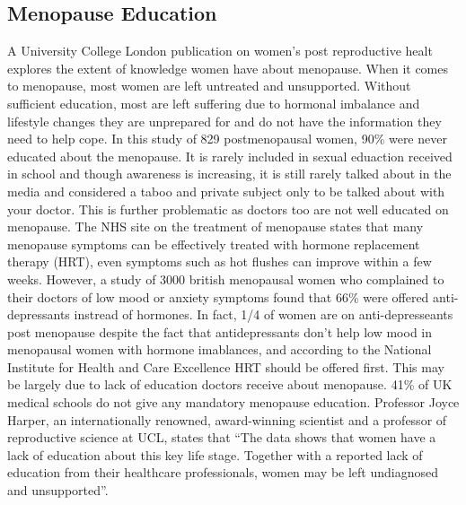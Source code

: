 \subsection{Menopause Education}
A University College London publication on women's post reproductive healt\cite{Aljumah2023} explores the extent of knowledge women have about menopause. When it comes to menopause, most women are left untreated and unsupported. Without sufficient education, most are left suffering due to hormonal imbalance and lifestyle changes they are unprepared for and do not have the information they need to help cope. In this study of 829 postmenopausal women, 90\% were never educated about the menopause. It is rarely included in sexual eduaction received in school and though awareness is increasing, it is still rarely talked about in the media and considered a taboo and private subject only to be talked about with your doctor\cite{Muir2022}. This is further problematic as doctors too are not well educated on menopause\cite{MenopauseSupport2021}. The NHS site on the treatment of menopause\cite{NHS2022} states that many menopause symptoms can be effectively treated with hormone replacement therapy (HRT), even symptoms such as hot flushes can improve within a few weeks. However, a study of 3000 british menopausal women who complained to their doctors of low mood or anxiety symptoms found that 66\% were offered anti-depressants instread of hormones\cite{NewsonHealth2019}. In fact, 1/4 of women are on anti-depresseants post menopause\cite{Brody2020} despite the fact that antidepressants don't help low mood in menopausal women with hormone imablances, and according to the National Institute for Health and Care Excellence\cite{NICE2019} HRT should be offered first. This may be largely due to lack of education doctors receive about menopause. 41\% of UK medical schools do not give any mandatory menopause education\cite{MenopauseSupport2021}. Professor Joyce Harper, an internationally renowned, award-winning scientist and a professor of reproductive science at UCL, states that “The data shows that women have a lack of education about this key life stage. Together with a reported lack of education from their healthcare professionals, women may be left undiagnosed and unsupported”\cite{UCL2023}.

